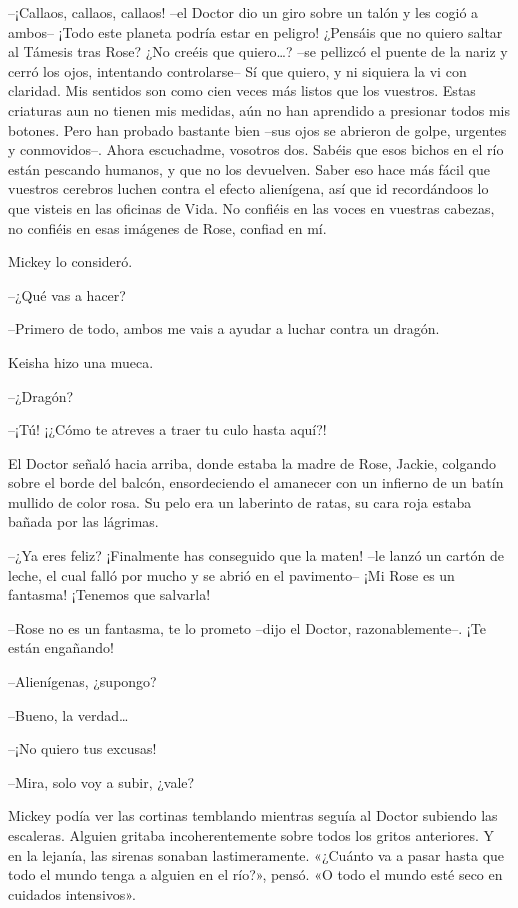 {--¡Callaos, callaos, callaos! --el Doctor dio un giro sobre un talón y
 les cogió a ambos-- ¡Todo este planeta podría estar en peligro! ¿Pensáis
 que no quiero saltar al Támesis tras Rose? ¿No creéis que
 quiero\ldots{}? --se pellizcó el puente de la nariz y cerró los ojos,
 intentando controlarse-- Sí que quiero, y ni siquiera la vi con
 claridad. Mis sentidos son como cien veces más listos que los vuestros.
 Estas criaturas aun no tienen mis medidas, aún no han aprendido a
 presionar todos mis botones. Pero han probado bastante bien --sus ojos
 se abrieron de golpe, urgentes y conmovidos--. Ahora escuchadme,
 vosotros dos. Sabéis que esos bichos en el río están pescando humanos, y
 que no los devuelven. Saber eso hace más fácil que vuestros cerebros
 luchen contra el efecto alienígena, así que id recordándoos lo que
 visteis en las oficinas de Vida. No confiéis en las voces en vuestras
cabezas, no confiéis en esas imágenes de Rose, confiad en mí.}

{Mickey lo consideró.}

{--¿Qué vas a hacer?}

{--Primero de todo, ambos me vais a ayudar a luchar contra un dragón.}

{Keisha hizo una mueca.}

{--¿Dragón?}

{--¡Tú! ¡¿Cómo te atreves a traer tu culo hasta aquí?!}

{El Doctor señaló hacia arriba, donde estaba la madre de Rose, Jackie,
 colgando sobre el borde del balcón, ensordeciendo el amanecer con un
 infierno de un batín mullido de color rosa. Su pelo era un laberinto de
ratas, su cara roja estaba bañada por las lágrimas.}

{--¿Ya eres feliz? ¡Finalmente has conseguido que la maten! --le lanzó
 un cartón de leche, el cual falló por mucho y se abrió en el pavimento--
¡Mi Rose es un fantasma! ¡Tenemos que salvarla!}

{--Rose no es un fantasma, te lo prometo --dijo el Doctor,
razonablemente--. ¡Te están engañando!}

{--Alienígenas, ¿supongo?}

{--Bueno, la verdad\ldots{}}

{--¡No quiero tus excusas!}

{--Mira, solo voy a subir, ¿vale?}

{Mickey podía ver las cortinas temblando mientras seguía al Doctor
 subiendo las escaleras. Alguien gritaba incoherentemente sobre todos los
 gritos anteriores. Y en la lejanía, las sirenas sonaban lastimeramente.
 «¿Cuánto va a pasar hasta que todo el mundo tenga a alguien en el río?»,
pensó. «O todo el mundo esté seco en cuidados intensivos».}

